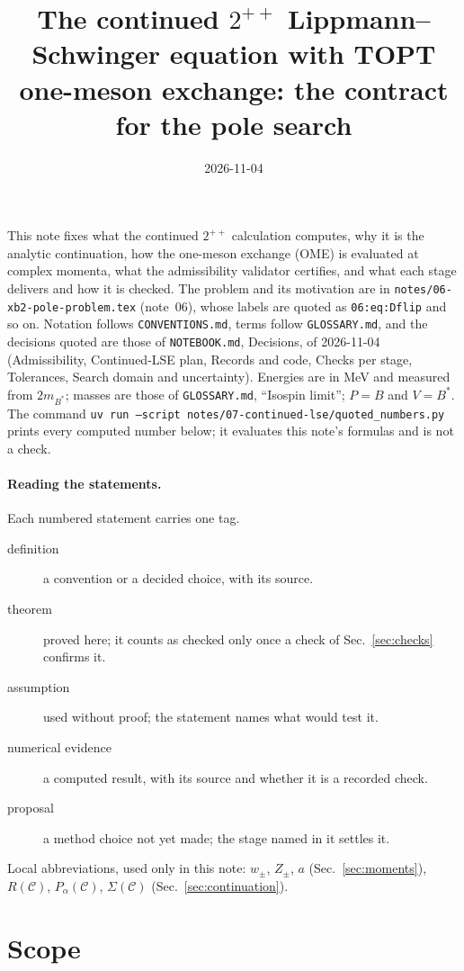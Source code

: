 \documentclass[11pt]{article}
\title{The continued $2^{++}$ Lippmann--Schwinger equation with TOPT one-meson exchange: the contract for the pole search}
\author{}
\date{2026-11-04}
\newcommand{\file}[1]{\nolinkurl{#1}}
\begin{document}
\maketitle

\noindent This note fixes what the continued $2^{++}$ calculation computes, why it is the analytic continuation, how the one-meson exchange (OME) is evaluated at complex momenta, what the admissibility validator certifies, and what each stage delivers and how it is checked. The problem and its motivation are in \file{notes/06-xb2-pole-problem.tex} (note~06), whose labels are quoted as \texttt{06:eq:Dflip} and so on. Notation follows \file{CONVENTIONS.md}, terms follow \file{GLOSSARY.md}, and the decisions quoted are those of \file{NOTEBOOK.md}, Decisions, of 2026-11-04 (Admissibility, Continued-LSE plan, Records and code, Checks per stage, Tolerances, Search domain and uncertainty). Energies are in MeV and measured from $2m_{B^*}$; masses are those of \file{GLOSSARY.md}, ``Isospin limit''; $P=B$ and $V=B^*$. The command \texttt{uv run --script notes/07-continued-lse/quoted\_numbers.py} prints every computed number below; it evaluates this note's formulas and is not a check.

\paragraph{Reading the statements.} Each numbered statement carries one tag.
\begin{description}
\item[definition] a convention or a decided choice, with its source.
\item[theorem] proved here; it counts as checked only once a check of Sec.~\ref{sec:checks} confirms it.
\item[assumption] used without proof; the statement names what would test it.
\item[numerical evidence] a computed result, with its source and whether it is a recorded check.
\item[proposal] a method choice not yet made; the stage named in it settles it.
\end{description}
Local abbreviations, used only in this note: $w_\pm$, $Z_\pm$, $a$ (Sec.~\ref{sec:moments}), $R(\mathcal C)$, $P_\alpha(\mathcal C)$, $\Sigma(\mathcal C)$ (Sec.~\ref{sec:continuation}).

\section{Scope}\label{sec:scope}
\end{document}
